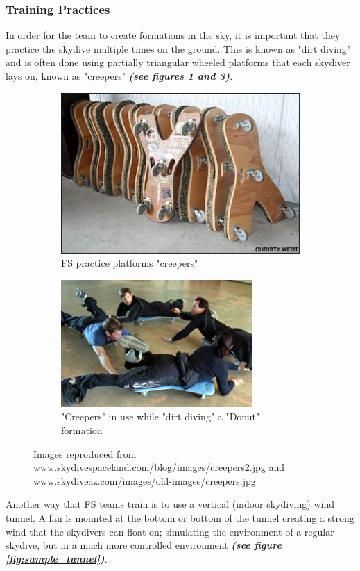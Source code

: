 \documentclass[a4paper, 12pt]{article}
\begin{document}
	\subsubsection{Training Practices}
In order for the team to create formations in the sky, it is important that they practice the skydive multiple times on the ground. This is known as "dirt diving" and is often done using partially triangular wheeled platforms that each skydiver lays on, known as "creepers"  \textbf{\emph{(see figures \ref{fig:creepers} and \ref{fig:creepers_use})}}.
\begin{figure}[H]
	\centering
	\begin{subfigure}{.5\textwidth}
		\centering
		\includegraphics[width=0.9\linewidth]{creepers.jpg}
		\caption{FS practice platforms "creepers"}
		\label{fig:creepers}
	\end{subfigure}%
	\begin{subfigure}{.5\textwidth}
		\centering
		\includegraphics[width=0.9\linewidth]{creepers_use.jpg}
		\caption{"Creepers" in use while "dirt diving" a "Donut" formation}
		\label{fig:creepers_use}
	\end{subfigure}
	\caption{Images reproduced from \url{www.skydivespaceland.com/blog/images/creepers2.jpg} and \url{www.skydiveaz.com/images/old-images/creepers.jpg}}
\end{figure}
%
\noindent Another way that FS teams train is to use a vertical (indoor skydiving) wind tunnel. A fan is mounted at the bottom or bottom of the tunnel creating a strong wind that the skydivers can float on; simulating the environment of a regular skydive, but in a much more controlled environment \textbf{\emph{(see figure \ref{fig:sample_tunnel})}}.
\end{document}
